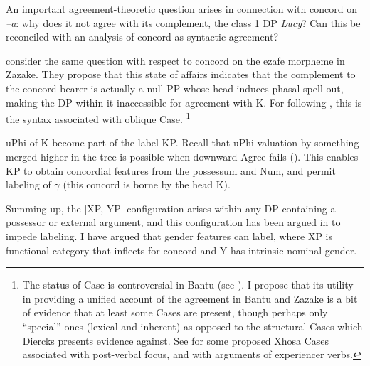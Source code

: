 \documentclass[output=paper
,modfonts
,nonflat]{langsci/langscibook}
\begin{document}
\noindent An important agreement-theoretic question arises in connection with concord on \textit{–a}: why does it not agree with its complement, the class 1 DP \textit{Lucy}? Can this be reconciled with an analysis of concord as syntactic agreement?

\citet{Toosarvandani_Van_Urk2014} consider the same question with respect to concord on the ezafe morpheme in Zazake. They propose that this state of affairs indicates that the complement to the concord-bearer is actually a null PP whose head induces phasal spell-out, making the DP within it inaccessible for agreement with K. For \citet{Toosarvandani_Van_Urk2014} following \citet{Rezac2008}, this is the syntax associated with oblique Case. \footnote{The status of Case is controversial in Bantu (see \citealt{Diercks2012}). I propose that its utility in providing a unified account of the agreement in Bantu and Zazake is a bit of evidence that at least some Cases are present, though perhaps only “special” ones (lexical and inherent) as opposed to the structural Cases which Diercks presents evidence against. See \citet{Carstens_Mletshe2015} for some proposed Xhosa Cases associated with post-verbal focus, and with arguments of experiencer verbs.}
\begin{figure}[!h]
	\begin{exe}
	\end{exe} \vspace{-0.7cm}
\end{figure}

\noindent uPhi of K become part of the label KP. Recall that uPhi valuation by something merged higher in the tree is possible when downward Agree fails (\citealt{Bejar_Rezac2009,Toosarvandani_Van_Urk2014,Carstens2016}). This enables KP to obtain concordial features from the possessum and Num, and permit labeling of $\gamma$ (this concord is borne by the head K).

Summing up, the [XP, YP] configuration arises within any DP containing a possessor or external argument, and this configuration has been argued in \citet{Chomsky2013, Chomsky2015} to impede labeling. I have argued that gender features can label, where XP is functional category that inflects for concord and Y has intrinsic nominal gender. 
\end{document}
